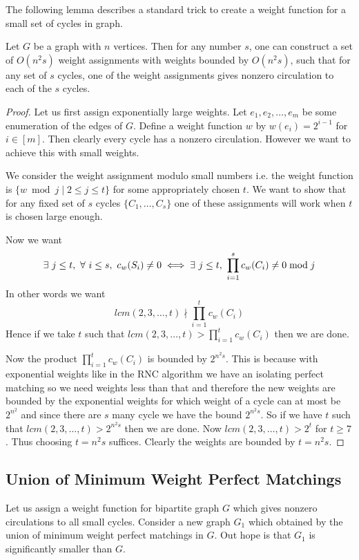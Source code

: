 The following lemma describes a standard trick to create a weight function for a small set of cycles in graph.
\begin{lemma}{\cite{ChariRohatgiSrinivasan_1993_Rou_CONF}}{}
	Let $G$ be a graph with $n$ vertices. Then for any number $s$, one can construct a set of $O(n^2s)$ weight assignments with weights bounded by $O(n^2s)$, such that for any set of $s$ cycles, one of the weight assignments gives nonzero circulation to each of the $s$ cycles.
\end{lemma}
\begin{proof}
	Let us first assign exponentially large weights. Let $e_1, e_2,\dots , e_m$ be some enumeration of the edges of $G$. Define  a weight function $w$ by $w(e_i)=2^{i-1}$ for $i\in [m]$. Then clearly every cycle has a nonzero circulation. However we want to achieve this with small weights.
	
We consider the weight assignment modulo small numbers i.e. the weight function is $\{w\bmod j\mid 2\leq j\leq t\}$ for some appropriately chosen $t$. We want to show that for any fixed set of $s$ cycles $\{C_1,\dots, C_s\}$ one of these assignments will work when $t$ is chosen large enough. 
	
	Now we want $$\exs\ j\leq t,\ \forall\ i\leq s,\ c_w(S_i)\neq 0\iff \exs\ j\leq t,\ \prod_{i=1}^s c_w(C_i)\neq 0\bmod j$$In other words we want $$lcm(2,3,\dots, t)\nmid \prod_{i=1}^t c_w(C_i)$$Hence if we take $t$ such that $lcm(2,3,\dots, t)> \prod\limits_{i=1}^t c_w(C_i)$ then we are done. 
	
	Now the product $\prod\limits_{i=1}^t c_w(C_i)$ is bounded by $2^{n^2s}$. This is because with exponential weights {like in the RNC algorithm} we have an isolating perfect matching so we need weights less than that and therefore the new weights are bounded by the exponential weights for which weight of a cycle can at most be $2^{n^2}$ and since there are $s$ many cycle we have the bound $2^{n^2s}$. So if we have $t$ such that $lcm(2,3,\dots, t)>2^{n^2s}$ then we are done. Now $lcm(2,3,\dots,t)>2^t$ for $t\geq 7$. Thus choosing $t=n^2s$ suffices. Clearly the weights are bounded by $t=n^2s$.
\end{proof}

\subsection{Union of Minimum Weight Perfect Matchings}
Let us assign a weight function for bipartite graph $G$ which gives nonzero circulations to all small cycles. Consider a new graph $G_1$ which obtained by the union of minimum weight perfect matchings in $G$. Out hope is that $G_1$ is significantly smaller than $G$.

